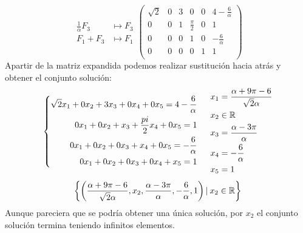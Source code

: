 \documentclass{article}
\begin{document}
\begin{enumerate}
\begin{itemize}
\[\begin{aligned}
                        \frac{1}{\alpha}F_3 &\mapsto F_3 \\
                        F_1 + F_3 &\mapsto F_1 
                    \end{aligned}
                    \left(
                    \begin{array}{ccccc|c}
                        \sqrt{2}    & 0        & 3        & 0               & 0        & 4 - \frac{6}{\alpha} \\
                        0           & 0        & 1        & \frac{\pi}{2}   & 0        & 1 \\
                        0           & 0        & 0        & 1               & 0        & -\frac{6}{\alpha} \\
                        0           & 0        & 0        & 0               & 1        & 1 \\
                    \end{array}
                    \right)
                \]
                Apartir de la matriz expandida podemos realizar sustitución hacia atrás y obtener el conjunto solución:
                \[
                    \left\{
                        \begin{aligned}
                            \sqrt{2}x_1 + 0x_2 + 3x_3 + 0x_4 + 0x_5 = 4 - \frac{6}{\alpha} \\
                            0x_1 + 0x_2 + x_3 + \frac{pi}{2}x_4 + 0x_5 = 1 \\
                            0x_1 + 0x_2 + 0x_3 + x_4 + 0x_5 = - \frac{6}{\alpha} \\
                            0x_1 + 0x_2 + 0x_3 + 0x_4 + x_5 = 1
                        \end{aligned}
                    \right.
                    \hspace{3ex}
                    \begin{aligned}
                        x_1 &= \frac{\alpha + 9\pi - 6}{\sqrt{2}\alpha} \\
                        x_2 &\in \mathbb{R} \\
                        x_3 &= \frac{\alpha - 3\pi}{\alpha} \\
                        x_4 &= -\frac{6}{\alpha} \\
                        x_5 &= 1
                    \end{aligned}
                \]
                \[
                    \left\{\left(\frac{\alpha + 9\pi - 6}{\sqrt{2}\alpha}, x_2, \frac{\alpha - 3\pi}{\alpha}, -\frac{6}{\alpha}, 1\right) \vert\hspace{0.5ex} x_2 \in \mathbb{R} \right\}
                \]
                Aunque pareciera que se podría obtener una única solución, por \(x_2\) el conjunto solución termina teniendo infinitos elementos.


\end{itemize}
\end{enumerate}
\end{document}
